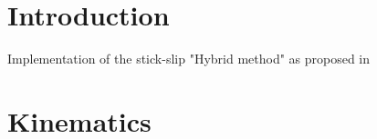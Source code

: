 \documentclass[3p]{elsarticle}
\begin{document}

%
%
%
%
%




\section{Introduction}
Implementation of the stick-slip "Hybrid method" as proposed in \cite{Geilinger2020}

\section{Kinematics}
\end{document}
